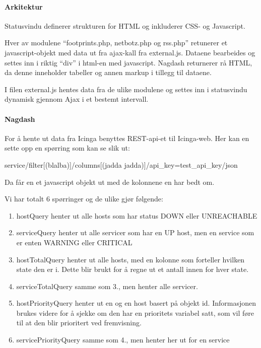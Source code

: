 
\paragraph{Arkitektur}

Statusvindu definerer strukturen for HTML og inkluderer CSS- og Javascript.

Hver av modulene “footprints.php, netbotz.php og rss.php” retunerer et javascript-objekt med data ut fra ajax-kall fra external.js. Dataene bearbeides og settes inn i riktig “div” i html-en med javascript. Nagdash returnerer rå HTML, da denne inneholder tabeller og annen markup i tillegg til dataene.

I filen external.js hentes data fra de ulike modulene og settes inn i statusvindu dynamisk gjennom Ajax i et bestemt intervall.


\paragraph{Nagdash}

For å hente ut data fra Icinga benyttes REST-api-et til Icinga-web. Her kan en sette opp en spørring som kan se slik ut:

service/filter[(blalba)]/columns[(jadda jadda)]/api\_key=test\_api\_key/json

Da får en et javascript objekt ut med de kolonnene en har bedt om.

Vi har totalt 6 spørringer og de ulike gjør følgende:
\begin{enumerate}
	\item  hostQuery henter ut alle hosts som har status DOWN eller UNREACHABLE
	\item  serviceQuery henter ut alle servicer som har en UP host, men en service som er enten WARNING eller CRITICAL
	\item  hostTotalQuery henter ut alle hosts, med en kolonne som forteller hvilken state den er i. Dette blir brukt for å regne ut et antall innen for hver state.
	\item  serviceTotalQuery samme som 3., men henter alle servicer.
	\item  hostPriorityQuery henter ut en og en host basert på objekt id. Informasjonen brukes videre for å sjekke om den har en prioritets variabel satt, som vil føre til at den blir prioritert ved fremvisning.
	\item  servicePriorityQuery samme som 4., men henter her ut for en service
\end{enumerate}

